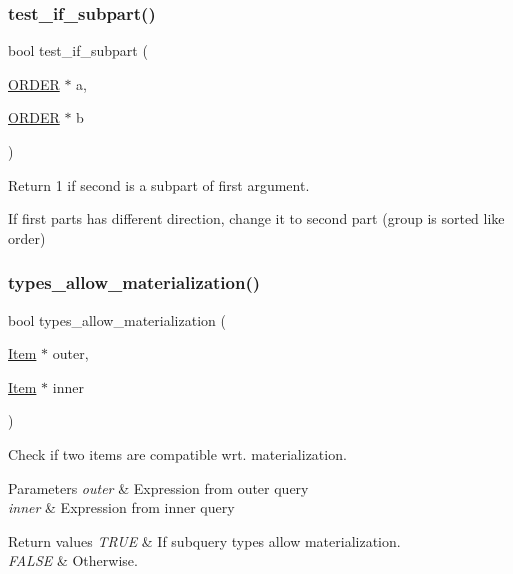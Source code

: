 \subsubsection{\texorpdfstring{test\+\_\+if\+\_\+subpart()}{test\_if\_subpart()}}
{\footnotesize\ttfamily bool test\+\_\+if\+\_\+subpart (\begin{DoxyParamCaption}\item[{\mbox{\hyperlink{structst__order}{O\+R\+D\+ER}} $\ast$}]{a,  }\item[{\mbox{\hyperlink{structst__order}{O\+R\+D\+ER}} $\ast$}]{b }\end{DoxyParamCaption})}

Return 1 if second is a subpart of first argument.

If first parts has different direction, change it to second part (group is sorted like order) \mbox{\label{group__Query__Optimizer_ga410e1c85b186cd5520a7d21930ead6e5}} 
\subsubsection{\texorpdfstring{types\+\_\+allow\+\_\+materialization()}{types\_allow\_materialization()}}
{\footnotesize\ttfamily bool types\+\_\+allow\+\_\+materialization (\begin{DoxyParamCaption}\item[{\mbox{\hyperlink{classItem}{Item}} $\ast$}]{outer,  }\item[{\mbox{\hyperlink{classItem}{Item}} $\ast$}]{inner }\end{DoxyParamCaption})}



Check if two items are compatible wrt. materialization. 


\begin{DoxyParams}{Parameters}
{\em outer} & Expression from outer query \\
\hline
{\em inner} & Expression from inner query\\
\hline
\end{DoxyParams}

\begin{DoxyRetVals}{Return values}
{\em T\+R\+UE} & If subquery types allow materialization. \\
\hline
{\em F\+A\+L\+SE} & Otherwise. \\
\hline
\end{DoxyRetVals}
\mbox{\label{group__Query__Optimizer_gaeaa6edcfa6c4d934dd42d505d9de2fef}} 
